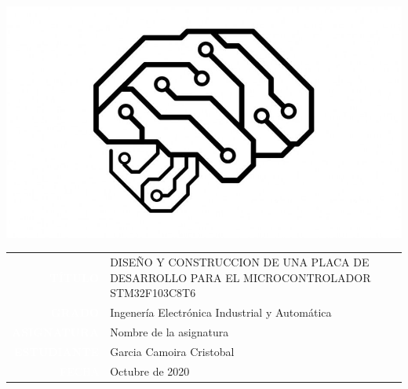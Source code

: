 \documentclass[10pt,a4paper,oneside]{article}
\begin{document}
\pagestyle{empty}

\begin{center} 
\includegraphics[scale=0.4]{Imagenes/PCB_Brain_circuit.png} 
\end{center}

\large

\vspace{3cm}

\begin{center}
{\setlength\arrayrulewidth{2pt}
\begin{tabular}{r|p{9.8cm}}
\arrayrulecolor{udc}
\colorbox{udc}{\textcolor{white}{\bf TÍTULO}}      
&	DISEÑO Y CONSTRUCCION DE UNA PLACA DE DESARROLLO PARA EL MICROCONTROLADOR STM32F103C8T6  \\[2cm]
\colorbox{udc}{\textcolor{white}{\bf GRADO}}       & Ingenería Electrónica Industrial y Automática    \\[1cm]
\colorbox{udc}{\textcolor{white}{\bf ASIGNATURA}}  & Nombre de la asignatura     \\[2cm]
\colorbox{udc}{\textcolor{white}{\bf ESTUDIANTE}}  &	Garcia Camoira Cristobal  \\[2cm]
\colorbox{udc}{\textcolor{white}{FECHA}}       &	Octubre de 2020
\end{tabular}}
\end{center}
\normalsize
\cleardoublepage
\end{document}
